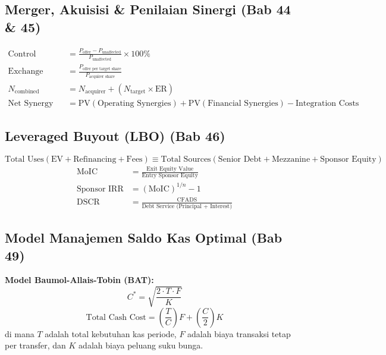 \documentclass[10pt,a4paper]{article}
\begin{document}
\subsection{Merger, Akuisisi \& Penilaian Sinergi (Bab 44 \& 45)}

\begin{align}
\text{Control Premium} &= \frac{P_{\text{offer}} - P_{\text{unaffected}}}{P_{\text{unaffected}}} \times 100\% \\
\text{Exchange Ratio (ER)} &= \frac{P_{\text{offer per target share}}}{P_{\text{acquirer share}}} \\
N_{\text{combined}} &= N_{\text{acquirer}} + (N_{\text{target}} \times \text{ER}) \\
\text{Net Synergy} &= \text{PV}(\text{Operating Synergies}) + \text{PV}(\text{Financial Synergies}) - \text{Integration Costs}
\end{align}

\subsection{Leveraged Buyout (LBO) (Bab 46)}

\begin{equation}
\text{Total Uses} (\text{EV} + \text{Refinancing} + \text{Fees}) \equiv \text{Total Sources} (\text{Senior Debt} + \text{Mezzanine} + \text{Sponsor Equity})
\end{equation}
\begin{align}
\text{MoIC} &= \frac{\text{Exit Equity Value}}{\text{Entry Sponsor Equity}} \\
\text{Sponsor IRR} &= (\text{MoIC})^{1/n} - 1 \\
\text{DSCR} &= \frac{\text{CFADS}}{\text{Debt Service (Principal + Interest)}}
\end{align}

\subsection{Model Manajemen Saldo Kas Optimal (Bab 49)}

\textbf{Model Baumol-Allais-Tobin (BAT):}
\begin{equation}
\boxed{C^* = \sqrt{\frac{2 \cdot T \cdot F}{K}}}
\end{equation}
\begin{equation}
\text{Total Cash Cost} = \left(\frac{T}{C}\right) F + \left(\frac{C}{2}\right) K
\end{equation}
di mana $T$ adalah total kebutuhan kas periode, $F$ adalah biaya transaksi tetap per transfer, dan $K$ adalah biaya peluang suku bunga.
\end{document}
